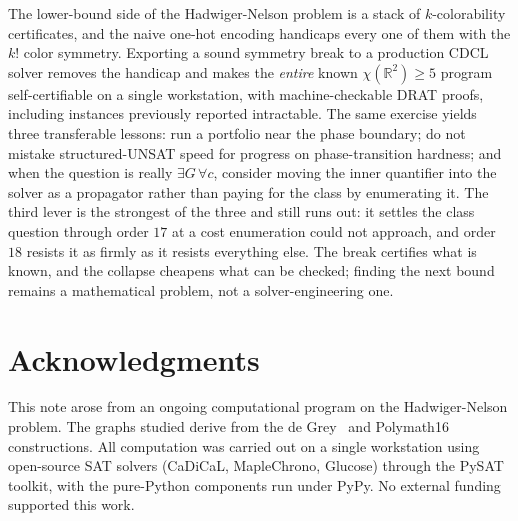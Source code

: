 \documentclass[11pt]{article}
\theoremstyle{definition}
\newcommand{\R}{\mathbb{R}}
\newcommand{\chrom}{\chi}
\begin{document}
The lower-bound side of the Hadwiger-Nelson problem is a stack of
$k$-colorability certificates, and the naive one-hot encoding handicaps every one
of them with the $k!$ color symmetry. Exporting a sound symmetry break to a
production CDCL solver removes the handicap and makes the \emph{entire} known
$\chrom(\R^2) \ge 5$ program self-certifiable on a single workstation, with
machine-checkable DRAT proofs, including instances previously reported
intractable. The same exercise yields three transferable lessons: run a portfolio
near the phase boundary; do not mistake structured-UNSAT speed for progress on
phase-transition hardness; and when the question is really $\exists G\,\forall c$,
consider moving the inner quantifier into the solver as a propagator rather than
paying for the class by enumerating it. The third lever is the strongest of the
three and still runs out: it settles the class question through order $17$ at a
cost enumeration could not approach, and order $18$ resists it as firmly as it
resists everything else. The break certifies what is known, and the collapse
cheapens what can be checked; finding the next bound remains a mathematical
problem, not a solver-engineering one.

\section*{Acknowledgments}
This note arose from an ongoing computational program on the Hadwiger-Nelson
problem. The graphs studied derive from the de Grey~\cite{deGrey2018} and
Polymath16~\cite{Polymath16} constructions. All computation was carried out on a
single workstation using open-source SAT solvers (CaDiCaL, MapleChrono, Glucose)
through the PySAT toolkit, with the pure-Python components run under PyPy. No
external funding supported this work.



\end{document}
